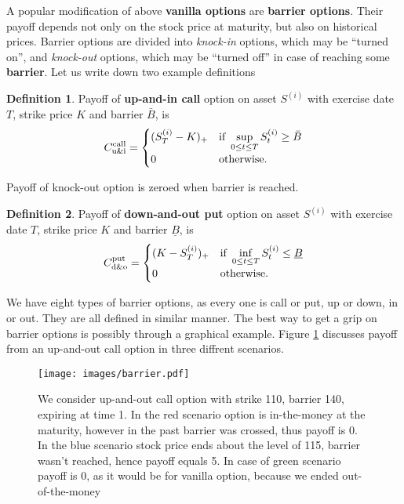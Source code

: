 \documentclass[a4paper,12pt, oneside]{book}
\theoremstyle{definition}
\newtheorem{mydef}{Definition}[section]
\theoremstyle{remark}
\begin{document}
A popular modification of above \textbf{vanilla options} are \textbf{barrier options}. Their payoff depends not only on the stock price at maturity, but also on historical prices. Barrier options are divided into \textit{knock-in} options, which may be ``turned on'', and \textit{knock-out} options, which may be ``turned off'' in case of reaching some \textbf{barrier}. Let us write down two example definitions
\begin{mydef}
Payoff of \textbf{up-and-in call} option on asset $S^{(i)}$ with exercise date $T$, strike price $K$ and barrier $\bar{B}$, is
\[ C^{\hbox{\scriptsize call}}_{\hbox{\scriptsize u\&i}} = 
\begin{cases}
 (S^{(i)}_T - K)_+    & \hbox{if } \sup\limits_{0 \leq t \leq T} S^{(i)}_t \geq \bar{B}\\
 0                    & \hbox{otherwise.}
\end{cases}
\]
\end{mydef}
Payoff of knock-out option is zeroed when barrier is reached.
\begin{mydef}
Payoff of \textbf{down-and-out put} option on asset $S^{(i)}$ with exercise date $T$, strike price $K$ and barrier $\underline{B}$, is
\[ C^{\hbox{\scriptsize put}}_{\hbox{\scriptsize d\&o}} = 
\begin{cases}
 (K - S^{(i)}_T)_+    & \hbox{if } \inf\limits_{0 \leq t \leq T} S^{(i)}_t \leq \underline{B}\\
 0                    & \hbox{otherwise.}
\end{cases}
\]
\end{mydef}
We have eight types of barrier options, as every one is call or put, up or down, in or out. They are all defined in similar manner. The best way to get a grip on barrier options is possibly through a graphical example. Figure \ref{fig:barrier} discusses payoff from an up-and-out call option in three diffrent scenarios. 
\begin{figure}[!ht]
\centering
 \texttt{[image: images/barrier.pdf]}
\caption{We consider up-and-out call option with strike 110, barrier 140, expiring at time 1. In the red scenario option is in-the-money at the maturity, however in the past barrier was crossed, thus payoff is 0. In the blue scenario stock price ends about the level of 115, barrier wasn't reached, hence payoff equals 5. In case of green scenario payoff is 0, as it would be for vanilla option, because we ended out-of-the-money }
\label{fig:barrier}
\end{figure}
\end{document}
